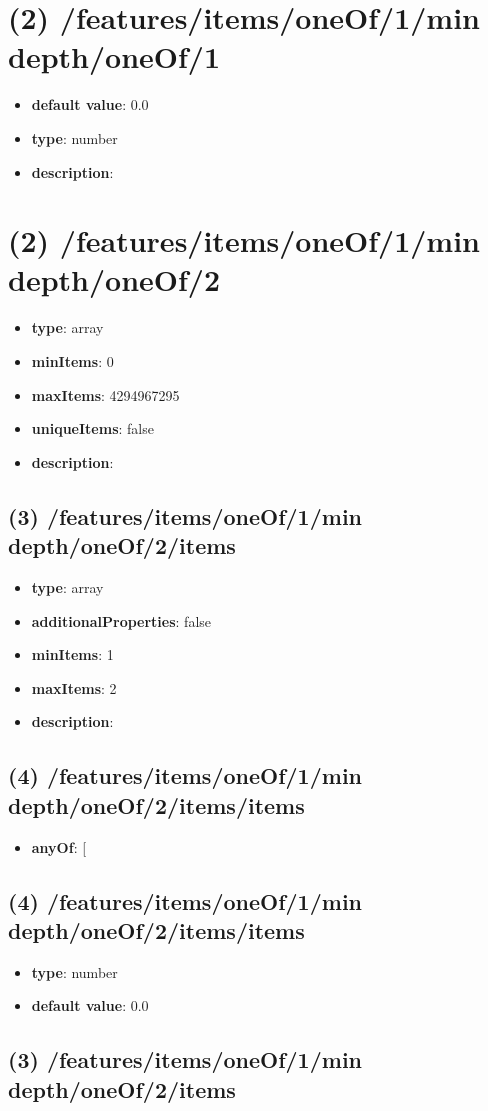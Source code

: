 \section{(2) /features/items/oneOf/1/min depth/oneOf/1}
\begin{itemize}[leftmargin=2em]\item {\bf default value}: 0.0
\item {\bf type}: number
\item {\bf description}: 
\end{itemize}\section{(2) /features/items/oneOf/1/min depth/oneOf/2}
\begin{itemize}[leftmargin=2em]\item {\bf type}: array
\item {\bf minItems}: 0
\item {\bf maxItems}: 4294967295
\item {\bf uniqueItems}: false
\item {\bf description}: 
\end{itemize}\subsection{(3) /features/items/oneOf/1/min depth/oneOf/2/items}
\begin{itemize}[leftmargin=3em]\item {\bf type}: array
\item {\bf additionalProperties}: false
\item {\bf minItems}: 1
\item {\bf maxItems}: 2
\item {\bf description}: 
\end{itemize}\subsection{(4) /features/items/oneOf/1/min depth/oneOf/2/items/items}
\begin{itemize}[leftmargin=4em]\item {\bf anyOf}: [\end{itemize}\subsection{(4) /features/items/oneOf/1/min depth/oneOf/2/items/items}
\begin{itemize}[leftmargin=4em]\item {\bf type}: number\item {\bf default value}: 0.0
\end{itemize}\subsection{(3) /features/items/oneOf/1/min depth/oneOf/2/items}
